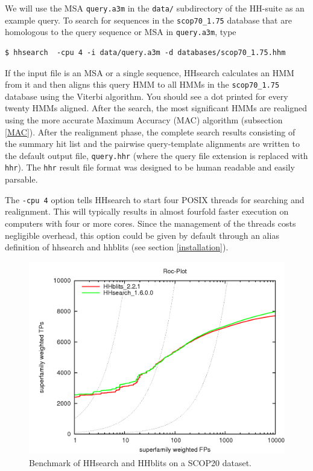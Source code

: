 \documentclass[11pt,a4paper]{article}
\begin{document}
We will use the MSA \verb`query.a3m` in the \verb`data/` subdirectory of the HH-suite as an example query. To search for sequences in the \verb`scop70_1.75` database that are homologous to the query sequence or MSA in \verb`query.a3m`, type

\begin{verbatim}
$ hhsearch  -cpu 4 -i data/query.a3m -d databases/scop70_1.75.hhm
\end{verbatim}

If the input file is an MSA or a single sequence, HHsearch calculates an HMM from it
and then aligns this query HMM to all 
HMMs in the \verb`scop70_1.75` database using the Viterbi algorithm. 
You should see a dot printed for every twenty HMMs aligned. After the search, 
the most significant HMMs are realigned using the more accurate Maximum Accuracy (MAC) 
algorithm (subsection \ref{MAC}). After the realignment phase, the complete search results consisting of the 
summary hit list and the pairwise query-template alignments are written to the default 
output file, \verb`query.hhr` (where the query file extension is replaced with \verb`hhr`). 
The \verb`hhr` result file format was designed to be human readable and easily parsable.

The \verb`-cpu 4` option tells HHsearch to start four POSIX threads for searching and realignment. This will typically results in almost fourfold faster execution on computers with four or more cores. Since the management of the threads costs negligible overhead, this option could be given by default through an alias definition of hhsearch and hhblits (see section \ref{installation}). 

\begin{figure}[h]
\begin{center}
\includegraphics[width=0.5 \textwidth]{hhblits-hhsearch.png}
\caption{Benchmark of HHsearch and HHblits on a SCOP20 dataset.}
\label{fig:hhsearch_hhblits_bench}
\end{center}
\end{figure}
\end{document}
